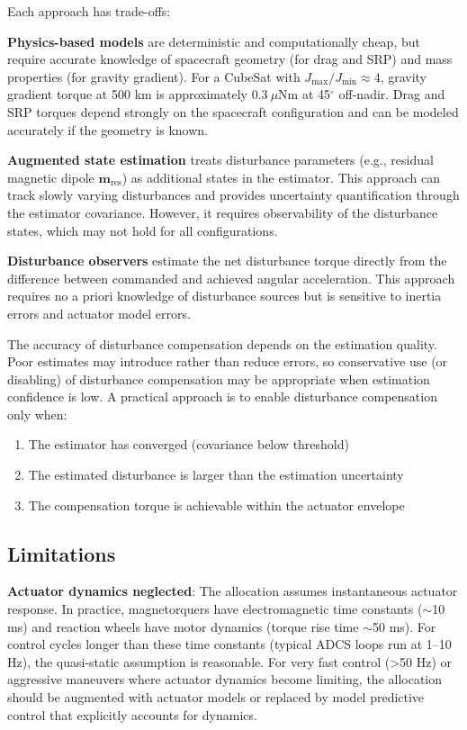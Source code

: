 \documentclass[conference]{IEEEtran}
\begin{document}
Each approach has trade-offs:

\textbf{Physics-based models} are deterministic and computationally cheap, but require accurate knowledge of spacecraft geometry (for drag and SRP) and mass properties (for gravity gradient). For a CubeSat with $J_{\max}/J_{\min} \approx 4$, gravity gradient torque at 500 km is approximately $0.3~\mu$Nm at 45$^\circ$ off-nadir. Drag and SRP torques depend strongly on the spacecraft configuration and can be modeled accurately if the geometry is known.

\textbf{Augmented state estimation} treats disturbance parameters (e.g., residual magnetic dipole $\mathbf{m}_{\text{res}}$) as additional states in the estimator. This approach can track slowly varying disturbances and provides uncertainty quantification through the estimator covariance. However, it requires observability of the disturbance states, which may not hold for all configurations.

\textbf{Disturbance observers} estimate the net disturbance torque directly from the difference between commanded and achieved angular acceleration. This approach requires no a priori knowledge of disturbance sources but is sensitive to inertia errors and actuator model errors.

The accuracy of disturbance compensation depends on the estimation quality. Poor estimates may introduce rather than reduce errors, so conservative use (or disabling) of disturbance compensation may be appropriate when estimation confidence is low. A practical approach is to enable disturbance compensation only when:
\begin{enumerate}
    \item The estimator has converged (covariance below threshold)
    \item The estimated disturbance is larger than the estimation uncertainty
    \item The compensation torque is achievable within the actuator envelope
\end{enumerate}

\subsection{Limitations}

\textbf{Actuator dynamics neglected}: The allocation assumes instantaneous actuator response. In practice, magnetorquers have electromagnetic time constants ($\sim$10 ms) and reaction wheels have motor dynamics (torque rise time $\sim$50 ms). For control cycles longer than these time constants (typical ADCS loops run at 1--10 Hz), the quasi-static assumption is reasonable. For very fast control (>50 Hz) or aggressive maneuvers where actuator dynamics become limiting, the allocation should be augmented with actuator models or replaced by model predictive control that explicitly accounts for dynamics.
\end{document}
